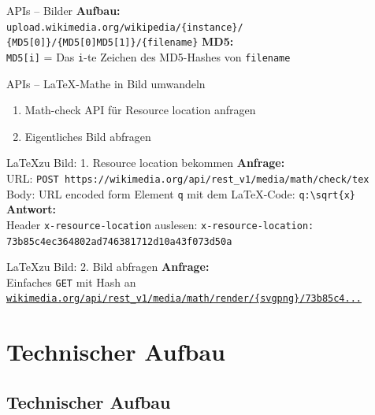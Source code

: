 \documentclass[9pt]{beamer}
\begin{document}
	\begin{frame}{APIs -- Bilder}
		\textbf{Aufbau:}\\
		\texttt{upload.wikimedia.org/wikipedia/\{instance\}/}
		\texttt{\{MD5[0]\}/\{MD5[0]MD5[1]\}/\{filename\}}
		\n
		\textbf{MD5:}\\
		\texttt{MD5[i]} = Das \texttt{i}-te Zeichen des MD5-Hashes von \texttt{filename}
	\end{frame}

	\begin{frame}{APIs -- \LaTeX-Mathe in Bild umwandeln}
		\begin{enumerate}
			\item Math-check API für Resource location anfragen
			\item Eigentliches Bild abfragen
		\end{enumerate}
	\end{frame}

	\begin{frame}[fragile]{\LaTeX zu Bild: 1. Resource location bekommen}
		\textbf{Anfrage:}\\
		URL: \texttt{POST https://wikimedia.org/api/rest\_v1/media/math/check/tex}\\
		Body: URL encoded form Element \texttt{q} mit dem \LaTeX-Code:\n
		\verb+q:\sqrt{x}+
		\n
		\textbf{Antwort:}\\
		Header \texttt{x-resource-location} auslesen:\n
		\texttt{x-resource-location: 73b85c4ec364802ad746381712d10a43f073d50a}
	\end{frame}

	\begin{frame}[fragile]{\LaTeX zu Bild: 2. Bild abfragen}
		\textbf{Anfrage:}\\
		Einfaches \texttt{GET} mit Hash an\n
		\href{https://wikimedia.org/api/rest_v1/media/math/render/svg/73b85c4ec364802ad746381712d10a43f073d50a}{\texttt{wikimedia.org/api/rest\_v1/media/math/render/\{svg\textbar png\}/73b85c4...}}
	\end{frame}
		
	\section{Technischer Aufbau}
	
	\subsection{Technischer Aufbau}
	
\end{document}
